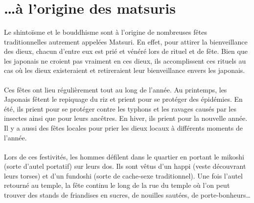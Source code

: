 \section[\ldots et les matsuris]{\ldots à l'origine des matsuris}

\paragraph{} Le shintoïsme et le bouddhisme sont à l’origine de nombreuses
fêtes traditionnelles autrement appelées Matsuri. En effet, pour attirer la
bienveillance des dieux, chacun d’entre eux est prié et vénéré lors de rituel
et de fête. Bien que les japonais ne croient pas vraiment en ces dieux, ils
accomplissent ces rituels au cas où les dieux existeraient et retireraient leur
bienveillance envers les japonais.

\paragraph{} Ces fêtes ont lieu régulièrement tout au long de l’année. Au
printemps, les Japonais fêtent le repiquage du riz et prient pour se protéger
des épidémies. En été, ils prient pour se protéger contre les typhons et les
ravages causés par les insectes ainsi que pour leurs ancêtres.  En hiver, ils
prient pour la nouvelle année. Il y a aussi des fêtes locales pour prier les
dieux locaux à différents moments de l’année.

\paragraph{} Lors de ces festivités, les hommes défilent dans le quartier en
portant le mikoshi (sorte d’autel portatif) sur leurs dos. Ils sont vêtus d’un
happi (veste découvrant leurs torses) et d’un fundoshi (sorte de cache-sexe
traditionnel). Une fois l’autel retourné au temple, la fête continu le long de
la rue du temple où l’on peut trouver des stands de friandises en sucres, de
nouilles sautées, de porte-bonheurs\ldots

